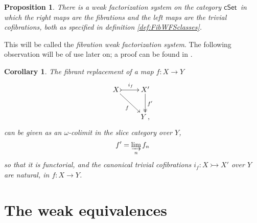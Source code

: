 \documentclass[12pt]{article}
\newcommand{\cSet}{\ensuremath{\mathsf{cSet}}}
\newcommand{\mono}{\ensuremath{\rightarrowtail}}
\renewcommand{\to}{\ensuremath{\rightarrow}}
\newcommand{\I}{\ensuremath{\mathrm{I}}}
\newtheorem{proposition}[theorem]{Proposition}
\newtheorem{corollary}[theorem]{Corollary}
\theoremstyle{remark}
\theoremstyle{definition}
\begin{document}
%

\begin{proposition}\label{prop:fibrationwfs}
There is a weak factorization system on the category \cSet\ in which the right maps are the fibrations and the left maps are the trivial cofibrations, both as specified in definition \ref{def:FibWFSclasses}.
\end{proposition}

This will be called the \emph{fibration weak factorization system}.
The following observation will be of use later on; a proof can be found in \cite{Garner, Awodey}.

\begin{corollary}
The \emph{fibrant replacement} of a map $f:X\to Y$ 
\begin{equation}%
\xymatrix{
X \ar[rd]_{f} \ar@{>->}[r]^{i_f} & X'\ar@{->>}[d]^{f'}\\
& Y \,,
}
\end{equation}
can be given as an $\omega$-colimit in the slice category over $Y$, $$f' = \varinjlim_n f_n$$
so that it is functorial, and the canonical trivial cofibrations $i_f : X\mono X'$ over $Y$ are natural, in $f : X \to Y$.  
\end{corollary}

\section{The weak equivalences}
\end{document}
